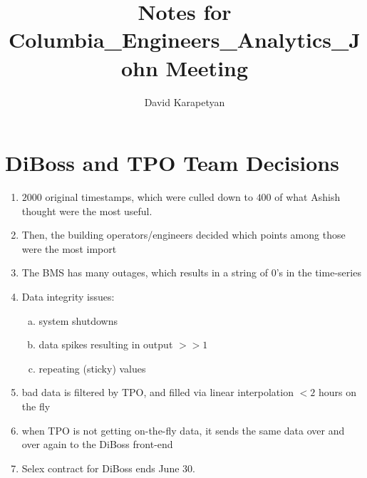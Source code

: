 \documentclass[12pt,a4paper]{article}
\author{David Karapetyan}
\title{Notes for Columbia_Engineers_Analytics_John Meeting}
\begin{document}
\section{DiBoss and TPO Team Decisions}
\begin{enumerate}
	\item $2000$ original timestamps, which were culled down to $400$ of what
		Ashish thought were the most useful.
	\item Then, the building operators/engineers decided which points among
		those were the most import
	\item The BMS has many outages, which results in a string of $0$'s
		in the time-series
	\item Data integrity issues:
		\begin{enumerate}[(a)]
			\item system shutdowns
			\item data spikes resulting in output $>> 1$
			\item repeating (sticky) values
		\end{enumerate}
	\item bad data is filtered by TPO, and filled via linear interpolation $<2$
		hours on the fly
	\item when TPO is not getting on-the-fly data, it sends the same data
		over and over again to the DiBoss front-end
	\item Selex contract for DiBoss ends June $30$.
\end{enumerate}
\end{document}
